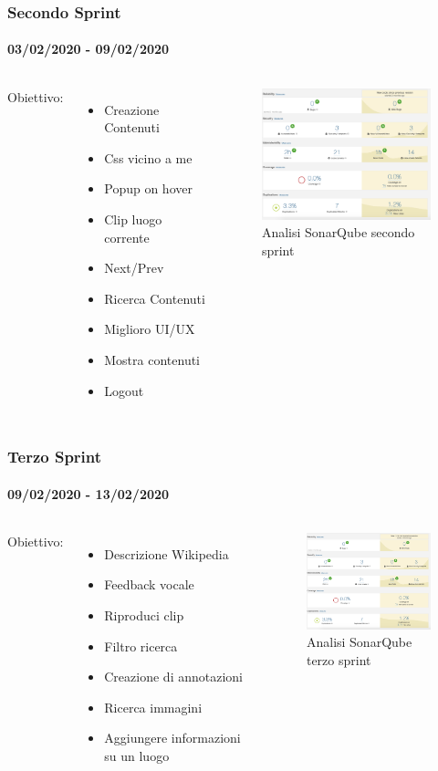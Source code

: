 \documentclass{beamer}
\begin{document}
\begin{frame}
\frametitle{Secondo Sprint}
\framesubtitle{03/02/2020 - 09/02/2020}
\begin{columns}
Obiettivo:
  \begin{itemize}
	\item Creazione Contenuti
	\item Css vicino a me
	\item Popup on hover
	\item Clip luogo corrente
	\item Next/Prev
	\item Ricerca Contenuti
	\item Miglioro UI/UX
	\item Mostra contenuti
	\item Logout
  \end{itemize}
	\begin{figure}[h]
        \includegraphics[width=5cm]{Images/SonarQube/terzo-sprint.png}
        \caption{Analisi SonarQube secondo sprint}
   \end{figure}
\end{columns}
\end{frame}

\begin{frame}
\frametitle{Terzo Sprint}
\framesubtitle{09/02/2020 - 13/02/2020}
\begin{columns}
Obiettivo:
  \begin{itemize}
	\item Descrizione Wikipedia
	\item Feedback vocale
	\item Riproduci clip
	\item Filtro ricerca
	\item Creazione di annotazioni
	\item Ricerca immagini
	\item Aggiungere informazioni su un luogo
  \end{itemize}
	\begin{figure}[h]
        \includegraphics[width=5cm]{Images/SonarQube/terzo-sprint.png}
        \caption{Analisi SonarQube terzo sprint}
   \end{figure}
\end{columns}
\end{frame}
\end{document}
